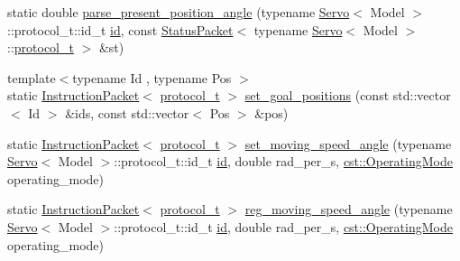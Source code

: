 \begin{DoxyCompactItemize}
\item 
static double \hyperlink{classdynamixel_1_1servos_1_1_servo_a8c4ff59fc0ea86b7b5c6e5733199357f}{parse\+\_\+present\+\_\+position\+\_\+angle} (typename \hyperlink{classdynamixel_1_1servos_1_1_servo}{Servo}$<$ Model $>$\+::protocol\+\_\+t\+::id\+\_\+t \hyperlink{classdynamixel_1_1servos_1_1_servo_a2d022081672e25a7bb57b76706e1cc57}{id}, const \hyperlink{classdynamixel_1_1_status_packet}{Status\+Packet}$<$ typename \hyperlink{classdynamixel_1_1servos_1_1_servo}{Servo}$<$ Model $>$\+::\hyperlink{classdynamixel_1_1servos_1_1_servo_a7718c41cee1187b992836f4b6bad8a38}{protocol\+\_\+t} $>$ \&st)
\item 
{\footnotesize template$<$typename Id , typename Pos $>$ }\\static \hyperlink{classdynamixel_1_1_instruction_packet}{Instruction\+Packet}$<$ \hyperlink{classdynamixel_1_1servos_1_1_servo_a7718c41cee1187b992836f4b6bad8a38}{protocol\+\_\+t} $>$ \hyperlink{classdynamixel_1_1servos_1_1_servo_acd87b062aab514f26d8cc36ea4b01220}{set\+\_\+goal\+\_\+positions} (const std\+::vector$<$ Id $>$ \&ids, const std\+::vector$<$ Pos $>$ \&pos)
\item 
static \hyperlink{classdynamixel_1_1_instruction_packet}{Instruction\+Packet}$<$ \hyperlink{classdynamixel_1_1servos_1_1_servo_a7718c41cee1187b992836f4b6bad8a38}{protocol\+\_\+t} $>$ \hyperlink{classdynamixel_1_1servos_1_1_servo_a0dd729c0a046d759b54c5c340ba9f40e}{set\+\_\+moving\+\_\+speed\+\_\+angle} (typename \hyperlink{classdynamixel_1_1servos_1_1_servo}{Servo}$<$ Model $>$\+::protocol\+\_\+t\+::id\+\_\+t \hyperlink{classdynamixel_1_1servos_1_1_servo_a2d022081672e25a7bb57b76706e1cc57}{id}, double rad\+\_\+per\+\_\+s, \hyperlink{namespacedynamixel_1_1servos_1_1cst_ac17b5608f65c6495114d34f8efc4d809}{cst\+::\+Operating\+Mode} operating\+\_\+mode)
\item 
static \hyperlink{classdynamixel_1_1_instruction_packet}{Instruction\+Packet}$<$ \hyperlink{classdynamixel_1_1servos_1_1_servo_a7718c41cee1187b992836f4b6bad8a38}{protocol\+\_\+t} $>$ \hyperlink{classdynamixel_1_1servos_1_1_servo_ac1d6177d421eda70f0b173fb7804a6af}{reg\+\_\+moving\+\_\+speed\+\_\+angle} (typename \hyperlink{classdynamixel_1_1servos_1_1_servo}{Servo}$<$ Model $>$\+::protocol\+\_\+t\+::id\+\_\+t \hyperlink{classdynamixel_1_1servos_1_1_servo_a2d022081672e25a7bb57b76706e1cc57}{id}, double rad\+\_\+per\+\_\+s, \hyperlink{namespacedynamixel_1_1servos_1_1cst_ac17b5608f65c6495114d34f8efc4d809}{cst\+::\+Operating\+Mode} operating\+\_\+mode)
\item 

\end{DoxyCompactItemize}
